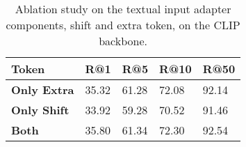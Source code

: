 \begin{table}[ht]
\centering
\caption{Ablation study on the textual input adapter components, shift and extra token, on the CLIP backbone.}
\label{tab:ablations_shift_extra}
\begin{tabular}{@{}lllll@{}}
\toprule
 Token & R@1 & R@5 & R@10 & R@50 \\ \midrule
{\bf Only Extra} & 35.32 & 61.28 & 72.08 & 92.14 \\
{\bf Only Shift} & 33.92 & 59.28 & 70.52 & 91.46 \\
{\bf Both} & 35.80 & 61.34 & 72.30 & 92.54 \\
 \bottomrule
\end{tabular}
\end{table}
